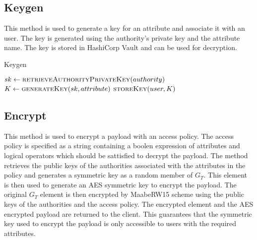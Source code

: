 \documentclass[cic,tc,english]{iiufrgs}
\begin{document}
        \subsection{Keygen}
            This method is used to generate a key for an attribute and associate it with an user. The key is generated using the authority's private key and the attribute name. The key is stored in HashiCorp Vault and can be used for decryption.

            \begin{algorithm}
                \caption{Keygen}
                \label{alg:keygen}
                \begin{algorithmic}[1]
                    \State $sk \gets \textsc{retrieveAuthorityPrivateKey}(authority)$
                    \State $K \gets \textsc{generateKey}(sk, attribute)$
                    \State $\textsc{storeKey}(user, K)$
                \EndProcedure
                \end{algorithmic}
            \end{algorithm}


        \subsection{Encrypt}
            This method is used to encrypt a payload with an access policy. The access policy is specified as a string containing a boolen expression of attributes and logical operators which should be sattisfied to decrypt the payload. The method retrieves the public keys of the authorities associated with the attributes in the policy and generates a symmetric key as a random member of $G_T$. This element is then used to generate an AES symmetric key to encrypt the payload. The original $G_T$ element is then encrypted by MaabeRW15 scheme using the public keys of the authorities and the access policy. The encrypted element and the AES encrypted payload are returned to the client. This guarantees that the symmetric key used to encrypt the payload is only accessible to users with the required attributes.
\end{document}
